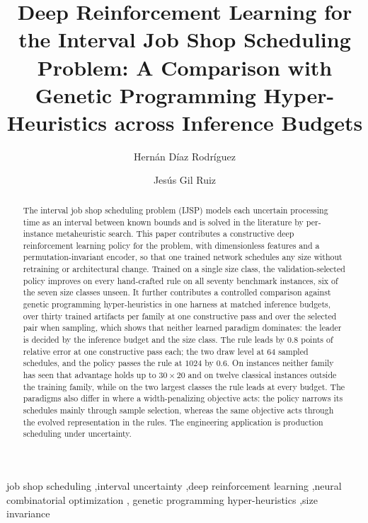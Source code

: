 \documentclass[preprint,12pt]{elsarticle}
\theoremstyle{definition}
\theoremstyle{remark}
\begin{document}
\begin{frontmatter}

\title{Deep Reinforcement Learning for the Interval Job Shop
Scheduling Problem: A Comparison with Genetic Programming
Hyper-Heuristics across Inference Budgets}

\author[1]{Hern\'an D\'iaz Rodr\'iguez}
\author[2]{Jes\'us Gil Ruiz}
\address[1]{Department of Computing, University of Oviedo,
Gij\'on, Spain}
\address[2]{Universidad Europea de Madrid, Madrid, Spain}

\begin{abstract}
The interval job shop scheduling problem (IJSP) models each uncertain
processing time as an interval between known bounds and is solved in
the literature by per-instance metaheuristic search. This paper
contributes a constructive deep reinforcement learning policy for the
problem, with dimensionless features and a permutation-invariant
encoder, so that one trained network schedules any size
without retraining or architectural change. Trained on a single
size class, the validation-selected policy improves on every
hand-crafted rule on all seventy benchmark instances, six
of the seven size classes unseen. It further contributes a
controlled comparison against genetic programming hyper-heuristics in
one harness at matched inference budgets, over thirty trained
artifacts per family at one constructive pass and over the selected
pair when sampling, which shows that neither learned
paradigm dominates: the leader is decided by the inference budget and
the size class. The rule leads by $0.8$ points of relative error at one
constructive pass each; the two draw level at $64$ sampled schedules,
and the policy passes the rule at $1024$ by $0.6$. On instances
neither family has seen that advantage holds up to $30{\times}20$ and
on twelve classical instances outside the training family, while on
the two largest classes the rule leads at every budget. The paradigms
also differ in where a width-penalizing objective acts: the policy
narrows its schedules mainly through sample selection, whereas the
same objective acts through the evolved representation in the rules. The engineering application is
production scheduling under uncertainty.
\end{abstract}

\begin{keyword}
job shop scheduling \sep interval uncertainty \sep deep
reinforcement learning \sep neural combinatorial optimization \sep
genetic programming hyper-heuristics \sep size invariance
\end{keyword}

\end{frontmatter}
\end{document}
